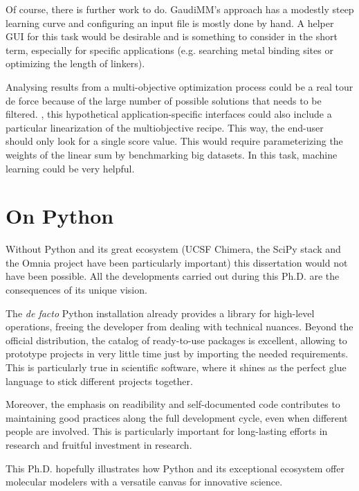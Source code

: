Of course, there is further work to do. GaudiMM's approach has a modestly steep learning curve and configuring an input file is mostly done by hand. A helper GUI for this task would be desirable and is something to consider in the short term, especially for specific applications (e.g. searching metal binding sites or optimizing the length of linkers).

Analysing results from a multi-objective optimization process could be a real tour de force because of the large number of possible solutions that needs to be filtered. , this hypothetical application-specific interfaces could also include a particular linearization of the multiobjective recipe. This way, the end-user should only look for a single score value. This would require parameterizing the weights of the linear sum by benchmarking big datasets. In this task, machine learning could be very helpful.

\section*{On Python}

Without Python and its great ecosystem (UCSF Chimera, the SciPy stack and the Omnia project have been particularly important) this dissertation would not have been possible. All the developments carried out during this Ph.D. are the consequences of its unique vision.

The \textit{de facto} Python installation already provides a library for high-level operations, freeing the developer from dealing with technical nuances. Beyond the official distribution, the catalog of ready-to-use packages is excellent, allowing to prototype projects in very little time just by importing the needed requirements. This is particularly true in scientific software, where it shines as the perfect glue language to stick different projects together.

Moreover, the emphasis on readibility and self-documented code contributes to maintaining good practices along the full development cycle, even when different people are involved. This is particularly important for long-lasting efforts in research and fruitful investment in research.

This Ph.D. hopefully illustrates how Python and its exceptional ecosystem offer molecular modelers with a versatile canvas for innovative science.
